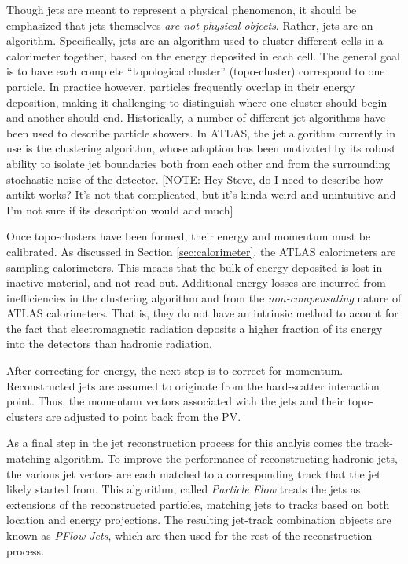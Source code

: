         Though jets are meant to represent a physical phenomenon,
            it should be emphasized that jets themselves \textit{are not physical objects}.
        Rather, jets are an algorithm.
        Specifically, jets are an algorithm used to cluster different cells in a calorimeter together,
            based on the energy deposited in each cell.
        The general goal is to have each complete ``topological cluster'' (topo-cluster) correspond to one particle.
        In practice however, particles frequently overlap in their energy deposition,
            making it challenging to distinguish where one cluster should begin and another should end.
        Historically, a number of different jet algorithms have been used to describe particle showers.
        In ATLAS, the jet algorithm currently in use is the \textit{\antikt} clustering algorithm\cite{anti_kt},
            whose adoption has been motivated by its robust ability to isolate jet boundaries both from each other
            and from the surrounding stochastic noise of the detector.
        [NOTE: Hey Steve, do I need to describe how antikt works?
        It's not that complicated, but it's kinda weird and unintuitive and I'm not sure if its description would add much]

        Once topo-clusters have been formed, their energy and momentum must be calibrated.
        As discussed in Section \ref{sec:calorimeter}, the ATLAS calorimeters are sampling calorimeters.
        This means that the bulk of energy deposited is lost in inactive material, and not read out.
        Additional energy losses are incurred from inefficiencies in the clustering algorithm and from the \textit{non-compensating} nature of ATLAS calorimeters.
        That is, they do not have an intrinsic method to acount for the fact that electromagnetic radiation deposits a higher fraction of its energy into the detectors than hadronic radiation\cite{cell_clustering}.

        After correcting for energy, the next step is to correct for momentum.
        Reconstructed jets are assumed to originate from the hard-scatter interaction point.
        Thus, the momentum vectors associated with the jets and their topo-clusters are adjusted to point back from the PV.

        As a final step in the jet reconstruction process for this analyis comes the track-matching algorithm.
        To improve the performance of reconstructing hadronic jets,
            the various jet vectors are each matched to a corresponding track that the jet likely started from.
        This algorithm, called \textit{Particle Flow} treats the jets as extensions of the reconstructed particles,
            matching jets to tracks based on both location and energy projections.
        The resulting jet-track combination objects are known as \textit{PFlow Jets},
            which are then used for the rest of the reconstruction process\cite{pflow}.


